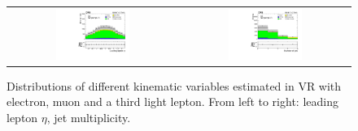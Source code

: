 \begin{figure}[tbh!]
 \begin{center}
 \begin{tabular}{cc}
  \includegraphics[width=0.45\textwidth]{figures/Part3/Nonprompt/VR/emul/lep1Eta}&
 \includegraphics[width=0.45\textwidth]{figures/Part3/Nonprompt/VR/emul/njet} \\
 \end{tabular}
 \caption{Distributions of different kinematic variables estimated in VR with electron, muon and a third light lepton. From left to right: leading lepton $\eta$, jet multiplicity.}
 \label{fig:VR_matrix_emul}
 \end{center}
\end{figure}

